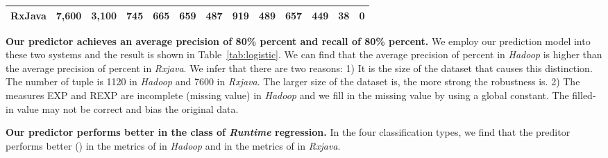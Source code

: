 \begin{table*}[tbh]
\begin{tabular}{|c|r|r|c|r|c|r|c|r|c|r|c|r|}
		RxJava            & 7,600                                                                           & 3,100                                                                  & \multicolumn{1}{r|}{745}                                & 665                                                                           & \multicolumn{1}{r|}{659}                                & 487                                                                           & \multicolumn{1}{r|}{919}                                & 489                                                                           & \multicolumn{1}{r|}{657}                                & 449                                                                           & \multicolumn{1}{r|}{38}                                 & 0                                                                             \\ \hline
	\end{tabular}
\end{table*}

 \textbf{Our predictor achieves an average precision of 80\% percent and recall of 80\% percent.} We employ our prediction model into these two systems and the result is shown in Table~\ref{tab:logistic}. We can find that the average precision of  percent in \emph{Hadoop} is higher than the average precision of  percent in \emph{Rxjava}. We infer that there are two reasons: 1) It is the size of the dataset that causes this distinction. The number of tuple is 1120 in \emph{Hadoop} and 7600 in \emph{Rxjava}. The larger size of the dataset is, the more strong the robustness is. 2) The measures EXP and REXP  are incomplete (missing value) in \emph{Hadoop} and we fill in the missing value by using a global constant. The filled-in value may not be correct and bias the original data.
 
 \textbf{Our predictor performs better in the class of \emph{Runtime} regression.} In the four classification types, we find that the preditor performs better () in the metrics of  in \emph{Hadoop} and in the metrics of  in \emph{Rxjava}.

